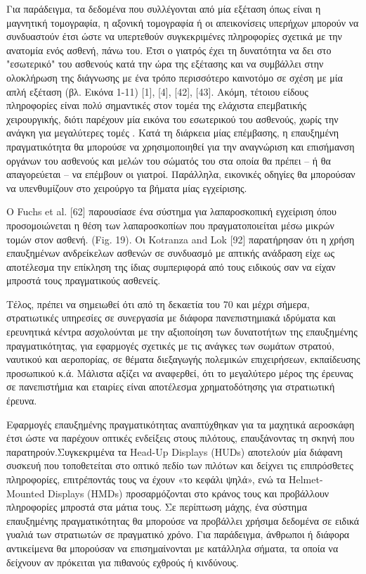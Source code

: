 Για παράδειγμα, τα δεδομένα που συλλέγονται από μία εξέταση όπως είναι η μαγνητική τομογραφία, η αξονική τομογραφία ή οι απεικονίσεις υπερήχων μπορούν να συνδυαστούν έτσι ώστε να υπερτεθούν συγκεκριμένες πληροφορίες σχετικά με την ανατομία ενός ασθενή, πάνω του. Έτσι ο γιατρός έχει τη δυνατότητα να δει στο "εσωτερικό" του ασθενούς κατά την ώρα της εξέτασης και να συμβάλλει στην ολοκλήρωση της διάγνωσης με ένα τρόπο περισσότερο καινοτόμο σε σχέση με μία απλή εξέταση (βλ. Εικόνα 1-11) [1], [4], [42], [43]. Ακόμη, τέτοιου είδους πληροφορίες είναι πολύ σημαντικές στον τομέα της ελάχιστα επεμβατικής χειρουργικής, διότι παρέχουν μία εικόνα του εσωτερικού του ασθενούς, χωρίς την ανάγκη για μεγαλύτερες τομές \cite{fuchs1998augmented}. Κατά τη διάρκεια μίας επέμβασης, η επαυξημένη πραγματικότητα θα μπορούσε να χρησιμοποιηθεί για την αναγνώριση και επισήμανση οργάνων του ασθενούς και μελών του σώματός του στα οποία θα πρέπει – ή θα απαγορεύεται – να επέμβουν οι γιατροί. Παράλληλα, εικονικές οδηγίες θα μπορούσαν να υπενθυμίζουν στο χειρούργο τα βήματα μίας εγχείρισης.

Ο Fuchs et al. [62] παρουσίασε ένα σύστημα για λαπαροσκοπική εγχείριση όπου προσομοιώνεται η θέση των λαπαροσκοπίων που πραγματοποιείται μέσω μικρών τομών στον ασθενή. (Fig. 19). Οι Kotranza and Lok [92] παρατήρησαν ότι η χρήση επαυξημένων ανδρείκελων ασθενών σε συνδυασμό με απτικής ανάδραση είχε ως αποτέλεσμα την επίκληση της ίδιας συμπεριφορά από τους ειδικούς σαν να είχαν μπροστά τους πραγματικούς ασθενείς. 







Τέλος, πρέπει να σημειωθεί ότι από τη δεκαετία του 70 και μέχρι σήμερα, στρατιωτικές υπηρεσίες σε συνεργασία με διάφορα πανεπιστημιακά ιδρύματα και ερευνητικά κέντρα ασχολούνται με την αξιοποίηση των δυνατοτήτων της επαυξημένης πραγματικότητας, για εφαρμογές σχετικές με τις ανάγκες των σωμάτων στρατού, ναυτικού και αεροπορίας, σε θέματα διεξαγωγής πολεμικών επιχειρήσεων, εκπαίδευσης προσωπικού κ.ά. Μάλιστα αξίζει να αναφερθεί, ότι το μεγαλύτερο μέρος της έρευνας σε πανεπιστήμια και εταιρίες είναι αποτέλεσμα χρηματοδότησης για στρατιωτική έρευνα.


Εφαρμογές επαυξημένης πραγματικότητας αναπτύχθηκαν για τα μαχητικά αεροσκάφη έτσι ώστε να παρέχουν οπτικές ενδείξεις στους πιλότους, επαυξάνοντας τη σκηνή που παρατηρούν.Συγκεκριμένα τα Head-Up Displays (HUDs) αποτελούν μία διάφανη συσκευή που τοποθετείται στο οπτικό πεδίο των πιλότων και δείχνει τις επιπρόσθετες πληροφορίες, επιτρέποντάς τους να έχουν «το κεφάλι ψηλά», ενώ τα Helmet-Mounted Displays (HMDs) προσαρμόζονται στο κράνος τους και προβάλλουν πληροφορίες μπροστά στα μάτια τους. Σε περίπτωση μάχης, ένα σύστημα επαυξημένης πραγματικότητας θα μπορούσε να προβάλλει χρήσιμα δεδομένα σε ειδικά γυαλιά των στρατιωτών σε πραγματικό χρόνο. Για παράδειγμα, άνθρωποι ή διάφορα αντικείμενα θα μπορούσαν να επισημαίνονται με κατάλληλα σήματα, τα οποία να δείχνουν αν πρόκειται για πιθανούς εχθρούς ή κινδύνους. 


